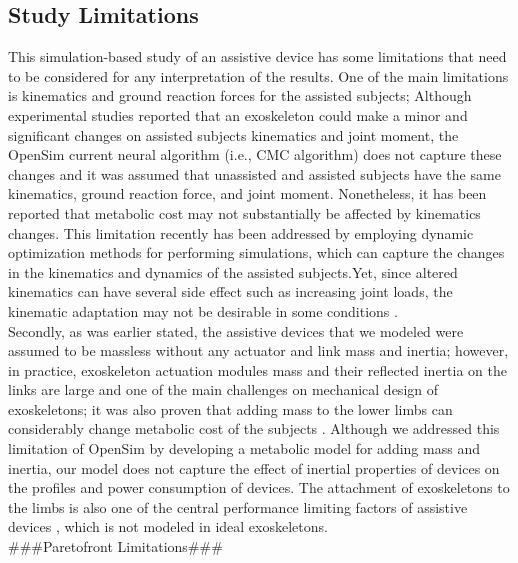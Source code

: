 \documentclass[10pt,letterpaper]{article}
\begin{document}
\subsection*{Study Limitations}
This simulation-based study of an assistive device has some limitations that need to be considered for any interpretation of the results. One of the main limitations is kinematics and ground reaction forces for the assisted subjects; Although experimental studies reported that an exoskeleton could make a minor \cite{42,79,91,114,115,116} and significant \cite{80,117,118,119} changes on assisted subjects kinematics and joint moment, the OpenSim current neural algorithm (i.e., CMC algorithm) does not capture these changes and it was assumed that unassisted and assisted subjects have the same kinematics, ground reaction force, and joint moment. Nonetheless, it has been reported that metabolic cost may not substantially be affected by kinematics changes\cite{120}. This limitation recently has been addressed by employing dynamic optimization methods for performing simulations, which can capture the changes in the kinematics and dynamics of the assisted subjects.Yet, since altered kinematics can have several side effect such as increasing joint loads, the kinematic adaptation may not be desirable in some conditions \cite{93}.\\  
Secondly, as was earlier stated, the assistive devices that we modeled were assumed to be massless without any actuator and link mass and inertia; however, in practice, exoskeleton actuation modules mass and their reflected inertia on the links are large and one of the main challenges on mechanical design of exoskeletons; it was also proven that adding mass to the lower limbs can considerably change metabolic cost of the subjects \cite{133}. Although we addressed this limitation of OpenSim by developing a metabolic model for adding mass and inertia, our model does not capture the effect of inertial properties of devices on the profiles and power consumption of devices. The attachment of exoskeletons to the limbs is also one of the central performance limiting factors of assistive devices \cite{121}, which is not modeled in ideal exoskeletons.\\
\#\#\#Paretofront Limitations\#\#\#\\
\end{document}
